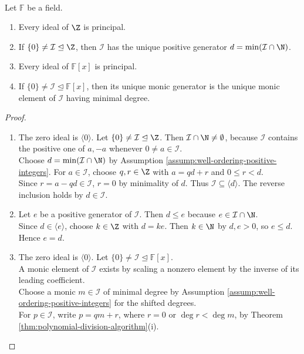 \begin{theorem} \label{thm:integers-and-polynomial-ring-are-pids} \\
Let $\mathbb{F}$ be a field.
\begin{enumerate}[label=(\roman*)]
\setlength{\itemsep}{0pt}
\item Every ideal of $\Z$ is principal.
\item If $\{0\}\neq\mathcal{I}\trianglelefteq\Z$, then $\mathcal{I}$ has the unique positive generator $d=\min(\mathcal{I}\cap\N)$.
\item Every ideal of $\mathbb{F}[x]$ is principal.
\item If $\{0\}\neq\mathcal{I}\trianglelefteq\mathbb{F}[x]$, then its unique monic generator is the unique monic element of $\mathcal{I}$ having minimal degree.
\end{enumerate}
\begin{proof}
\begin{enumerate}[label=(\roman*)]
\setlength{\itemsep}{0pt}
\item The zero ideal is $\langle0\rangle$. Let $\{0\}\neq\mathcal{I}\trianglelefteq\Z$. Then $\mathcal{I}\cap\N\neq\emptyset$, because $\mathcal{I}$ contains the positive one of $a,-a$ whenever $0\neq a\in\mathcal{I}$.\\
Choose $d=\min(\mathcal{I}\cap\N)$ by Assumption \ref{assump:well-ordering-positive-integers}. For $a\in\mathcal{I}$, choose $q,r\in\Z$ with $a=qd+r$ and $0\leq r<d$.\\
Since $r=a-qd\in\mathcal{I}$, $r=0$ by minimality of $d$. Thus $\mathcal{I}\subseteq\langle d\rangle$. The reverse inclusion holds by $d\in\mathcal{I}$.
\item Let $e$ be a positive generator of $\mathcal{I}$. Then $d\leq e$ because $e\in\mathcal{I}\cap\N$.\\
Since $d\in\langle e\rangle$, choose $k\in\Z$ with $d=ke$. Then $k\in\N$ by $d,e>0$, so $e\leq d$. Hence $e=d$.
\item The zero ideal is $\langle0\rangle$. Let $\{0\}\neq\mathcal{I}\trianglelefteq\mathbb{F}[x]$.\\
A monic element of $\mathcal{I}$ exists by scaling a nonzero element by the inverse of its leading coefficient.\\
Choose a monic $m\in\mathcal{I}$ of minimal degree by Assumption \ref{assump:well-ordering-positive-integers} for the shifted degrees.\\
For $p\in\mathcal{I}$, write $p=qm+r$, where $r=0$ or $\deg r<\deg m$, by Theorem \ref{thm:polynomial-division-algorithm}(i).\\

\end{enumerate}
\end{proof}
\end{theorem}
